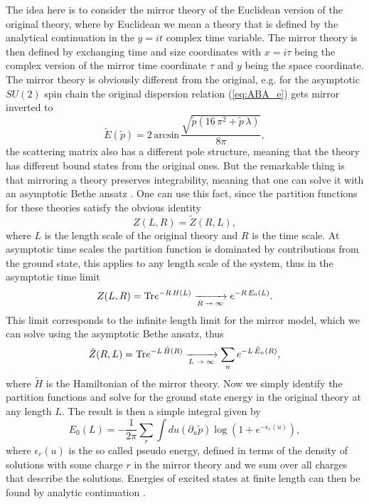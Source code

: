  The idea here is to consider the mirror theory of the Euclidean version of the original theory, where by Euclidean we mean a theory that is defined by the analytical continuation in the $y = i t$ complex time variable. The mirror theory is then defined by exchanging time and size coordinates with $x=i\tau$ being the complex version of the mirror time coordinate $\tau$ and $y$ being the space coordinate. The mirror theory is obviously different from the original, e.g. for the asymptotic $SU(2)$ spin chain the original dispersion relation (\ref{eq:ABA_e}) gets mirror inverted to \cite{Arutyunov:2009ga}
\begin{equation}
	\tilde{E}(\tilde{p}) = 2 \, \mathrm{arcsin} \, \frac{\sqrt{\tilde{p} \left( 16 \, \pi^2 + \tilde{p} \, \lambda \right)}}{8 \pi},
\end{equation}
the scattering matrix also has a different pole structure, meaning that the theory has different bound states from the original ones. But the remarkable thing is that mirroring a theory preserves integrability, meaning that one can solve it with an asymptotic Bethe ansatz \cite{Bajnok:2010ke}. One can use this fact, since the partition functions for these theories satisfy the obvious identity
\begin{equation}
	Z(L,R) = \tilde{Z}(R,L),
\end{equation}
where $L$ is the length scale of the original theory and $R$ is the time scale. At asymptotic time scales the partition function is dominated by contributions from the ground state, this applies to any length scale of the system, thus in the asymptotic time limit 
\begin{equation}
	Z(L,R) = \mathrm{Tr} e^{-R \, H(L)} \xrightarrow[\text{$R \rightarrow \infty$}]{} e^{-R \, E_0(L)}.
\end{equation}
This limit corresponds to the infinite length limit for the mirror model, which we can solve using the asymptotic Bethe ansatz, thus
\begin{equation}
	\tilde{Z}(R,L) = \mathrm{Tr} e^{-L \, \tilde{H}(R)} \xrightarrow[\text{$L \rightarrow \infty$}]{}  \sum_n e^{-L \, \tilde{E}_n(R)},
\end{equation}
where $\tilde{H}$ is the Hamiltonian of the mirror theory. Now we simply identify the partition functions and solve for the ground state energy in the original theory at any length $L$. The result is then a simple integral given by \cite{Bajnok:2010ke}
\begin{equation}
	E_0(L) = - \frac{1}{2 \pi} \sum_r \int du \left( \partial_u \tilde{p} \right) \log \left( 1 + e^{-\epsilon_r(u)} \right), 
\end{equation}
where $\epsilon_r(u)$ is the so called pseudo energy, defined in terms of the density of solutions with some charge $r$ in the mirror theory and we sum over all charges that describe the solutions. Energies of excited states at finite length can then be found by analytic continuation \cite{Dorey:1996re}.

